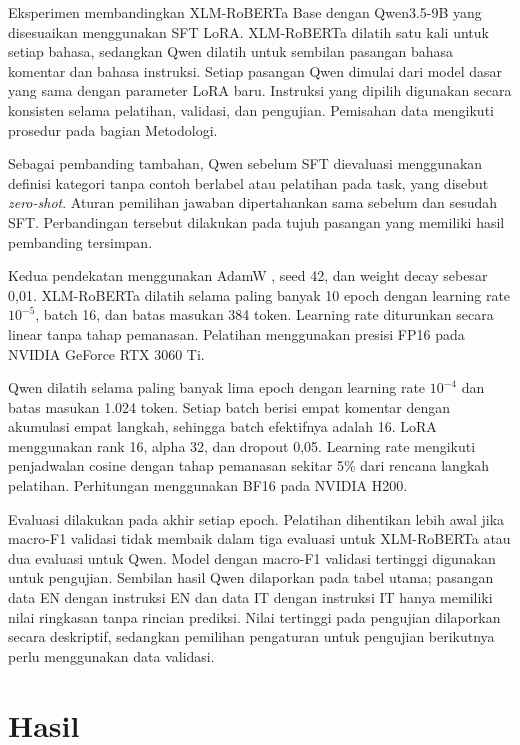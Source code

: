 \documentclass[11pt]{article}
\begin{document}
Eksperimen membandingkan XLM-RoBERTa Base dengan Qwen3.5-9B yang disesuaikan menggunakan SFT LoRA. XLM-RoBERTa dilatih satu kali untuk setiap bahasa, sedangkan Qwen dilatih untuk sembilan pasangan bahasa komentar dan bahasa instruksi. Setiap pasangan Qwen dimulai dari model dasar yang sama dengan parameter LoRA baru. Instruksi yang dipilih digunakan secara konsisten selama pelatihan, validasi, dan pengujian. Pemisahan data mengikuti prosedur pada bagian Metodologi.

Sebagai pembanding tambahan, Qwen sebelum SFT dievaluasi menggunakan definisi kategori tanpa contoh berlabel atau pelatihan pada task, yang disebut \textit{zero-shot}. Aturan pemilihan jawaban dipertahankan sama sebelum dan sesudah SFT. Perbandingan tersebut dilakukan pada tujuh pasangan yang memiliki hasil pembanding tersimpan.

Kedua pendekatan menggunakan AdamW \citep{loshchilov-hutter-2019-decoupled}, seed 42, dan weight decay sebesar 0,01. XLM-RoBERTa dilatih selama paling banyak 10 epoch dengan learning rate $10^{-5}$, batch 16, dan batas masukan 384 token. Learning rate diturunkan secara linear tanpa tahap pemanasan. Pelatihan menggunakan presisi FP16 pada NVIDIA GeForce RTX 3060 Ti.

Qwen dilatih selama paling banyak lima epoch dengan learning rate $10^{-4}$ dan batas masukan 1.024 token. Setiap batch berisi empat komentar dengan akumulasi empat langkah, sehingga batch efektifnya adalah 16. LoRA menggunakan rank 16, alpha 32, dan dropout 0,05. Learning rate mengikuti penjadwalan cosine dengan tahap pemanasan sekitar 5\% dari rencana langkah pelatihan. Perhitungan menggunakan BF16 pada NVIDIA H200.

Evaluasi dilakukan pada akhir setiap epoch. Pelatihan dihentikan lebih awal jika macro-F1 validasi tidak membaik dalam tiga evaluasi untuk XLM-RoBERTa atau dua evaluasi untuk Qwen. Model dengan macro-F1 validasi tertinggi digunakan untuk pengujian. Sembilan hasil Qwen dilaporkan pada tabel utama; pasangan data EN dengan instruksi EN dan data IT dengan instruksi IT hanya memiliki nilai ringkasan tanpa rincian prediksi. Nilai tertinggi pada pengujian dilaporkan secara deskriptif, sedangkan pemilihan pengaturan untuk pengujian berikutnya perlu menggunakan data validasi.

\section{Hasil}
\end{document}
